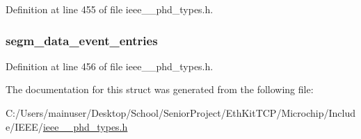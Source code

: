 Definition at line 455 of file ieee\+\_\+\_\+phd\+\_\+types.\+h.

\hypertarget{struct___segment_data_event_a6c8af5e311383b41ff92f9586c86a971}{}
\subsubsection[{segm\+\_\+data\+\_\+event\+\_\+entries}]{ segm\+\_\+data\+\_\+event\+\_\+entries}\label{struct___segment_data_event_a6c8af5e311383b41ff92f9586c86a971}


Definition at line 456 of file ieee\+\_\+\_\+phd\+\_\+types.\+h.



The documentation for this struct was generated from the following file\+:\begin{DoxyCompactItemize}
\item 
C\+:/\+Users/mainuser/\+Desktop/\+School/\+Senior\+Project/\+Eth\+Kit\+T\+C\+P/\+Microchip/\+Include/\+I\+E\+E\+E/\hyperlink{ieee__11073__phd__types_8h}{ieee\+\_\+\_\+phd\+\_\+types.\+h}\end{DoxyCompactItemize}
